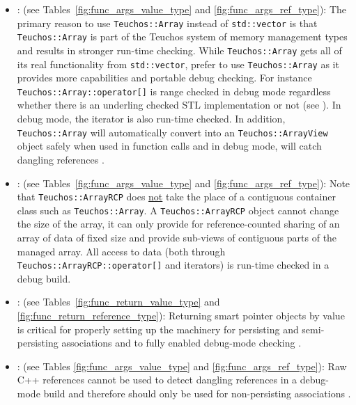 \begin{itemize}
{}\item\GCGTeuchosArray: (see Tables~\ref{fig:func_args_value_type}
and {}\ref{fig:func_args_ref_type}): The primary reason to use
{}\texttt{Teuchos::\-Array} instead of {}\texttt{std::\-vector} is
that {}\texttt{Teuchos::\-Array} is part of the Teuchos system of
memory management types and results in stronger run-time checking.
While {}\texttt{Teuchos::\-Array} gets all of its real functionality
from {}\texttt{std::\-vector}, prefer to use
{}\texttt{Teuchos::\-Array} as it provides more capabilities and
portable debug checking.  For instance
{}\texttt{Teuchos::\-Array::\-operator[]} is range checked in debug
mode regardless whether there is an underling checked STL
implementation or not (see {}\cite[Item 83]{C++CodingStandards05}).
In debug mode, the iterator is also run-time checked.  In addition,
{}\texttt{Teuchos\-::Array} will automatically convert into an
{}\texttt{Teuchos\-::ArrayView} object safely when used in function
calls and in debug mode, will catch dangling references
{}\cite{TeuchosMemoryManagementGuide}.


{}\item\GCGTeuchosArrayRCP: (see Tables~\ref{fig:func_args_value_type} and
{}\ref{fig:func_args_ref_type}): Note that {}\texttt{Teuchos::ArrayRCP} does
{}\underline{not} take the place of a contiguous container class such as
{}\texttt{Teuchos::\-Array}.  A {}\texttt{Teuchos::ArrayRCP} object cannot
change the size of the array, it can only provide for reference-counted
sharing of an array of data of fixed size and provide sub-views of contiguous
parts of the managed array.  All access to data (both through
{}\texttt{Teuchos::\-ArrayRCP::\-operator[]} and iterators) is run-time checked
in a debug build.


{}\item\GCGReturnSmartPointersByValue: (see
Tables~\ref{fig:func_return_value_type} and
{}\ref{fig:func_return_reference_type}): Returning smart pointer
objects by value is critical for properly setting up the machinery for
persisting and semi-persisting associations and to fully enabled
debug-mode checking {}\cite{TeuchosMemoryManagementGuide}.


{}\item\GCGRawReferencesNonPersisting: (see Tables
{}\ref{fig:func_args_value_type} and {}\ref{fig:func_args_ref_type}):
Raw C++ references cannot be used to detect dangling references in a
debug-mode build and therefore should only be used for non-persisting
associations {}\cite{TeuchosMemoryManagementGuide}.



\end{itemize}
